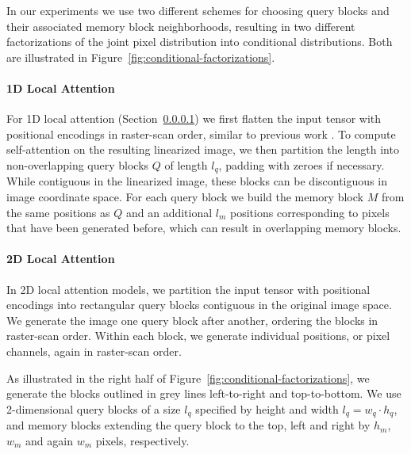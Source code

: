 In our experiments we use two different schemes for choosing query blocks and their associated memory block neighborhoods, resulting in two different factorizations of the joint pixel distribution into conditional distributions. Both are illustrated in Figure~\ref{fig:conditional-factorizations}.


\paragraph{1D Local Attention} \label{sec:loc-1d} 
For 1D local attention (Section~\ref{sec:loc-1d}) we first flatten the input tensor with positional encodings in raster-scan order, similar to previous work \citep{PixelRNN}. To compute self-attention on the resulting linearized image, we then partition the length into non-overlapping query blocks $Q$ of length $l_{q}$, padding with zeroes if necessary. While contiguous in the linearized image, these blocks can be discontiguous in image coordinate space. For each query block we build the memory block $M$ from the same positions as $Q$ and an additional $l_{m}$ positions corresponding to pixels that have been generated before, which can result in overlapping memory blocks.

\paragraph{2D Local Attention} \label{sec:loc-2d} In 2D local attention models, we partition the input tensor with positional encodings into rectangular query blocks contiguous in the original image space. We generate the image one query block after another, ordering the blocks in raster-scan order. Within each block, we generate individual positions, or pixel channels, again in raster-scan order.

As illustrated in the right half of Figure~\ref{fig:conditional-factorizations}, we generate the blocks outlined in grey lines left-to-right and top-to-bottom. We use 2-dimensional query blocks of a size $l_q$ specified by height and width $l_q = w_q \cdot h_q$, and memory blocks extending the query block to the top, left and right by $h_m$, $w_m$ and again $w_m$ pixels, respectively.

